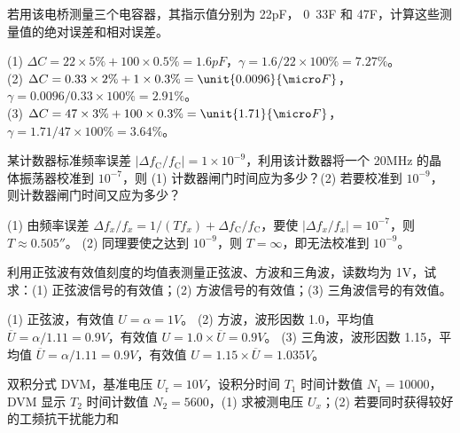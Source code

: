 \documentclass[a4paper,12pt]{examdesign}
\begin{document}
\begin{shortanswer}[title={二、计算题 (每题 10 分，共 80 分)}]
\begin{question}
若用该电桥测量三个电容器，其指示值分别为 \unit{22}{pF}，
\unit{0.33}{\micro F} 和 \unit{47}{\micro F}，计算这些测量值的绝对误差和相对误差。
    \examvspace*{5cm}
    \begin{answer}
        (1) $\Delta C = 22 \times 5\% + 100 \times 0.5\% =
        \unit{1.6}{pF}$，$\gamma = 1.6/22 \times 100\% = 7.27\%$。\\
        (2) $\Delta C = 0.33 \times 2\%+1\times 0.3\% =
        \unit{0.0096}{\micro F}$，$\gamma = 0.0096/0.33 \times 100\% =
        2.91\%$。\\
        (3) $\Delta C = 47\times 3\%+100\times 0.3\% =
        \unit{1.71}{\micro F}$，$\gamma = 1.71/47 \times 100\% = 3.64\%$。
    \end{answer}
\end{question}
\begin{question}
    某计数器标准频率误差 $|\Delta f_\mathrm{C}/f_\mathrm{C}|=1\times
    10^{-9}$，利用该计数器将一个 \unit{20}{MHz} 的晶体振荡器校准到
    $10^{-7}$，则 (1) 计数器闸门时间应为多少？(2) 若要校准到 $10^{-9}$，则计数器闸门时间又应为多少？
    \examvspace*{5cm}
    \begin{answer}
        (1) 由频率误差 $\Delta f_x / f_x = 1/(Tf_x) + \Delta
        f_\mathrm{C}/f_\mathrm{C}$，要使 $|\Delta f_x/f_x| =
        10^{-7}$，则 $T \approx \unit{0.505}{\second}$。
        (2) 同理要使之达到 $10^{-9}$，则 $T=\infty$，即无法校准到
        $10^{-9}$。
    \end{answer}
\end{question}
\begin{question}
    利用正弦波有效值刻度的均值表测量正弦波、方波和三角波，读数均为
    \unit{1}{V}，试求：(1) 正弦波信号的有效值；(2) 方波信号的有效值；(3) 三角波信号的有效值。
    \examvspace*{10cm}
    \begin{answer}
        (1) 正弦波，有效值 $U = \alpha = \unit{1}{V}$。
        (2) 方波，波形因数 1.0，平均值 $\overline{U} = \alpha / 1.11 =
        \unit{0.9}{V}$，有效值 $U = 1.0 \times \overline{U} =
        \unit{0.9}{V}$。
(3) 三角波，波形因数 1.15，平均值 $\overline{U} = \alpha / 1.11 =
        \unit{0.9}{V}$，有效值 $U = 1.15 \times \overline{U} =
        \unit{1.035}{V}$。
    \end{answer}
\end{question}
\begin{question}
    双积分式 DVM，基准电压 $U_\mathrm{r} = \unit{10}{V}$，设积分时间
    $T_1$ 时间计数值 $N_1 = 10000$， DVM 显示 $T_2$ 时间计数值 $N_2 =
    5600$，(1) 求被测电压 $U_x$；(2) 若要同时获得较好的工频抗干扰能力和

\end{question}
\end{shortanswer}
\end{document}
